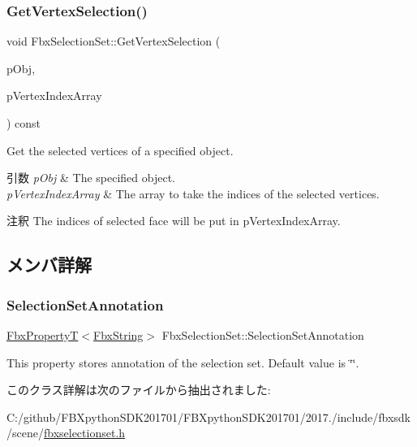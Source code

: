 \subsubsection{\texorpdfstring{Get\+Vertex\+Selection()}{GetVertexSelection()}}
{\footnotesize\ttfamily void Fbx\+Selection\+Set\+::\+Get\+Vertex\+Selection (\begin{DoxyParamCaption}\item[{\hyperlink{class_fbx_object}{Fbx\+Object} $\ast$}]{p\+Obj,  }\item[{\hyperlink{class_fbx_array}{Fbx\+Array}$<$ int $>$ \&}]{p\+Vertex\+Index\+Array }\end{DoxyParamCaption}) const}

Get the selected vertices of a specified object. 
\begin{DoxyParams}{引数}
{\em p\+Obj} & The specified object. \\
\hline
{\em p\+Vertex\+Index\+Array} & The array to take the indices of the selected vertices. \\
\hline
\end{DoxyParams}
\begin{DoxyRemark}{注釈}
The indices of selected face will be put in p\+Vertex\+Index\+Array. 
\end{DoxyRemark}


\subsection{メンバ詳解}
\mbox{\label{class_fbx_selection_set_abe27bd368bd6e3df129e808900a72f19}} 
\subsubsection{\texorpdfstring{Selection\+Set\+Annotation}{SelectionSetAnnotation}}
{\footnotesize\ttfamily \hyperlink{class_fbx_property_t}{Fbx\+PropertyT}$<$\hyperlink{class_fbx_string}{Fbx\+String}$>$ Fbx\+Selection\+Set\+::\+Selection\+Set\+Annotation}

This property stores annotation of the selection set. Default value is \char`\"{}\char`\"{}. 

このクラス詳解は次のファイルから抽出されました\+:\begin{DoxyCompactItemize}
\item 
C\+:/github/\+F\+B\+Xpython\+S\+D\+K201701/\+F\+B\+Xpython\+S\+D\+K201701/2017./include/fbxsdk/scene/\hyperlink{fbxselectionset_8h}{fbxselectionset.\+h}\end{DoxyCompactItemize}
